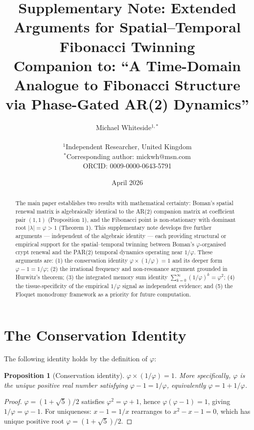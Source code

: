 \documentclass[11pt,letterpaper]{article}
\title{\textbf{Supplementary Note: Extended Arguments for Spatial--Temporal Fibonacci Twinning}\\
\large Companion to: ``A Time-Domain Analogue to Fibonacci Structure via Phase-Gated AR(2) Dynamics''}
\author{
Michael Whiteside$^{1,*}$ \\
\\
$^1$Independent Researcher, United Kingdom \\
$^*$Corresponding author: mickwh@msn.com \\
ORCID: 0009-0000-0643-5791
}
\date{April 2026}
\newtheorem{proposition}{Proposition}
\theoremstyle{definition}
\theoremstyle{remark}
\begin{document}
\maketitle

\begin{abstract}
\noindent The main paper establishes two results with mathematical certainty: Boman's spatial renewal
matrix is algebraically identical to the AR(2) companion matrix at coefficient pair $(1,1)$
(Proposition 1), and the Fibonacci point is non-stationary with dominant root $|\lambda|=\varphi>1$
(Theorem 1). This supplementary note develops five further arguments --- independent of the algebraic
identity --- each providing structural or empirical support for the spatial--temporal twinning between
Boman's $\varphi$-organised crypt renewal and the PAR(2) temporal dynamics operating near $1/\varphi$.
These arguments are: (1) the conservation identity $\varphi \times (1/\varphi) = 1$ and its
deeper form $\varphi - 1 = 1/\varphi$; (2) the irrational frequency and non-resonance argument
grounded in Hurwitz's theorem; (3) the integrated memory sum identity $\sum_{k=0}^{\infty}(1/\varphi)^k = \varphi^2$;
(4) the tissue-specificity of the empirical $1/\varphi$ signal as independent evidence; and (5)
the Floquet monodromy framework as a priority for future computation.
\end{abstract}

\tableofcontents
\newpage

\section{The Conservation Identity}
\label{sec:conservation}

The following identity holds by the definition of $\varphi$:

\begin{proposition}[Conservation identity]\label{prop:conservation}
$\varphi \times (1/\varphi) = 1$. More specifically, $\varphi$ is the unique positive real
number satisfying $\varphi - 1 = 1/\varphi$, equivalently $\varphi = 1 + 1/\varphi$.
\end{proposition}

\begin{proof}
$\varphi = (1+\sqrt{5})/2$ satisfies $\varphi^2 = \varphi + 1$, hence
$\varphi(\varphi - 1) = 1$, giving $1/\varphi = \varphi - 1$.
For uniqueness: $x - 1 = 1/x$ rearranges to $x^2 - x - 1 = 0$, which has unique positive root
$\varphi = (1+\sqrt{5})/2$.
\end{proof}
\end{document}
